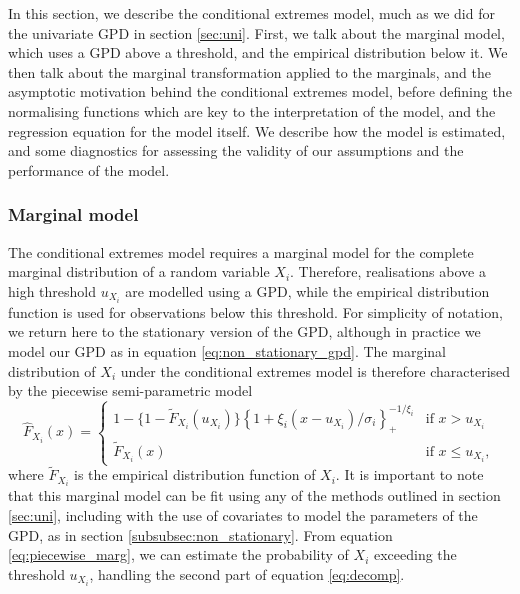 \documentclass{article}
\numberwithin{equation}{section}
\begin{document}
In this section, we describe the conditional extremes model, much as we did for the univariate GPD in section \ref{sec:uni}.
First, we talk about the marginal model, which uses a GPD above a threshold, and the empirical distribution below it. 
We then talk about the marginal transformation applied to the marginals, and the asymptotic motivation behind the conditional extremes model, before defining the normalising functions which are key to the interpretation of the model, and the regression equation for the model itself.
We describe how the model is estimated, and some diagnostics for assessing the validity of our assumptions and the performance of the model.

\subsubsection{Marginal model}

The conditional extremes model requires a marginal model for the complete marginal distribution of a random variable $X_i$.
Therefore, realisations above a high threshold $u_{X_i}$ are modelled using a GPD, while the empirical distribution function is used for observations below this threshold.
For simplicity of notation, we return here to the stationary version of the GPD, although in practice we model our GPD as in equation \eqref{eq:non_stationary_gpd}.
The marginal distribution of $X_i$ under the conditional extremes model is therefore characterised by the piecewise semi-parametric model
\begin{equation} \label{eq:piecewise_marg}
  \hat{F}_{X_i}(x) = \begin{cases}
    1 - \{ 1 - \tilde{F}_{X_i}(u_{X_i})\} \left\{1 + \xi_{i}(x - u_{X_i})/\sigma_i\right\}_{+}^{-1/\xi_{i}} & \text{if } x > u_{X_i} \\
    \tilde{F}_{X_i}(x) & \text{if } x \le u_{X_i},
  \end{cases}
\end{equation}
where $\tilde{F}_{X_i}$ is the empirical distribution function of $X_i$.
It is important to note that this marginal model can be fit using any of the methods outlined in section \ref{sec:uni}, including with the use of covariates to model the parameters of the GPD, as in section \ref{subsubsec:non_stationary}.
From equation \ref{eq:piecewise_marg}, we can estimate the probability of $X_i$ exceeding the threshold $u_{X_i}$, handling the second part of equation \eqref{eq:decomp}. 
\end{document}
